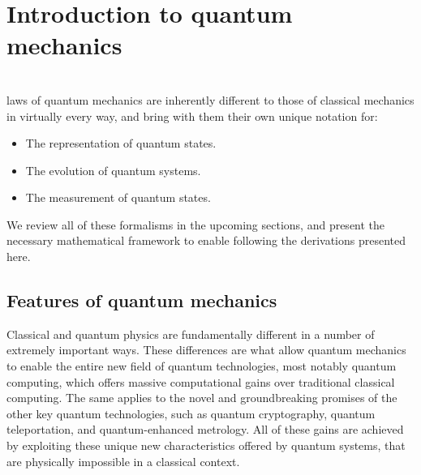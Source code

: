 %
%

\section{Introduction to quantum mechanics}

\\

 laws of quantum mechanics are inherently different to those of classical mechanics in virtually every way, and bring with them their own unique notation for:
\begin{itemize}
	\item The representation of quantum states.
	\item The evolution of quantum systems.
	\item The measurement of quantum states.
\end{itemize}
We review all of these formalisms in the upcoming sections, and present the necessary mathematical framework to enable following the derivations presented here.

%
%

\subsection{Features of quantum mechanics}

Classical and quantum physics are fundamentally different in a number of extremely important ways. These differences are what allow quantum mechanics to enable the entire new field of quantum technologies, most notably quantum computing, which offers massive computational gains over traditional classical computing. The same applies to the novel and groundbreaking promises of the other key quantum technologies, such as quantum cryptography, quantum teleportation, and quantum-enhanced metrology. All of these gains are achieved by exploiting these unique new characteristics offered by quantum systems, that are physically impossible in a classical context.

